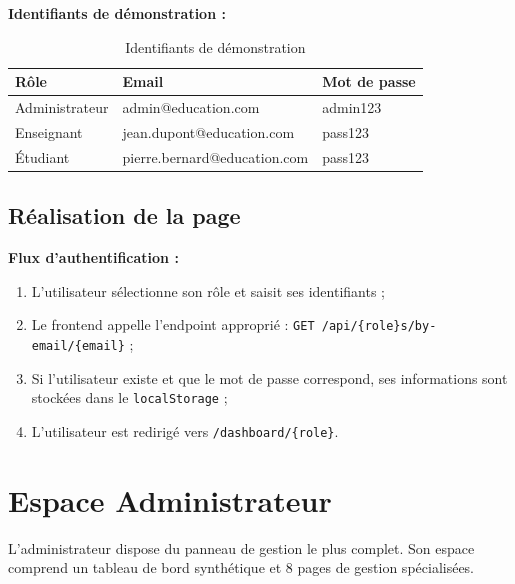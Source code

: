 \vspace{0.3cm}

\textbf{Identifiants de démonstration :}

\begin{table}[H]
\centering
\caption{Identifiants de démonstration}
\label{tab:demo_credentials}
\begin{tabular}{lll}
\toprule
\textbf{Rôle} & \textbf{Email} & \textbf{Mot de passe} \\
\midrule
Administrateur & admin@education.com & admin123 \\
Enseignant & jean.dupont@education.com & pass123 \\
Étudiant & pierre.bernard@education.com & pass123 \\
\bottomrule
\end{tabular}
\end{table}

\subsection{Réalisation de la page}


\textbf{Flux d'authentification :}
\begin{enumerate}[noitemsep]
    \item L'utilisateur sélectionne son rôle et saisit ses identifiants ;
    \item Le frontend appelle l'endpoint approprié : \texttt{GET /api/\{role\}s/by-email/\{email\}} ;
    \item Si l'utilisateur existe et que le mot de passe correspond, ses informations sont stockées dans le \texttt{localStorage} ;
    \item L'utilisateur est redirigé vers \texttt{/dashboard/\{role\}}.
\end{enumerate}

\section{Espace Administrateur}

L'administrateur dispose du panneau de gestion le plus complet. Son espace comprend un tableau de bord synthétique et 8 pages de gestion spécialisées.

